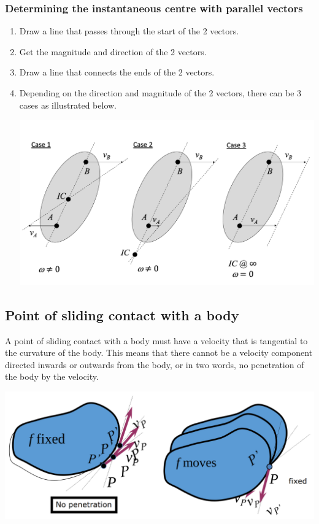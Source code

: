 \documentclass[11pt]{article}
\begin{document}
\subsubsection{Determining the instantaneous centre with parallel vectors}
\label{sec:orgfba6639}
\begin{enumerate}
\item Draw a line that passes through the start of the 2 vectors.
\item Get the magnitude and direction of the 2 vectors.
\item Draw a line that connects the ends of the 2 vectors.
\item Depending on the direction and magnitude of the 2 vectors, there can be 3 cases as illustrated below.
\begin{center}
\includegraphics[width=.9\linewidth]{./images/instantaneous-centre-parallel-vectors.png}
\end{center}
\end{enumerate}

\subsection{Point of sliding contact with a body}
\label{sec:orgb72f550}
A point of sliding contact with a body must have a velocity that is tangential to the curvature of the body. This means that there cannot be a velocity component directed inwards or outwards from the body, or in two words, no penetration of the body by the velocity.

\begin{center}
\includegraphics[width=.9\linewidth]{./images/sliding-contact-of-a-point.png}
\end{center}
\end{document}
